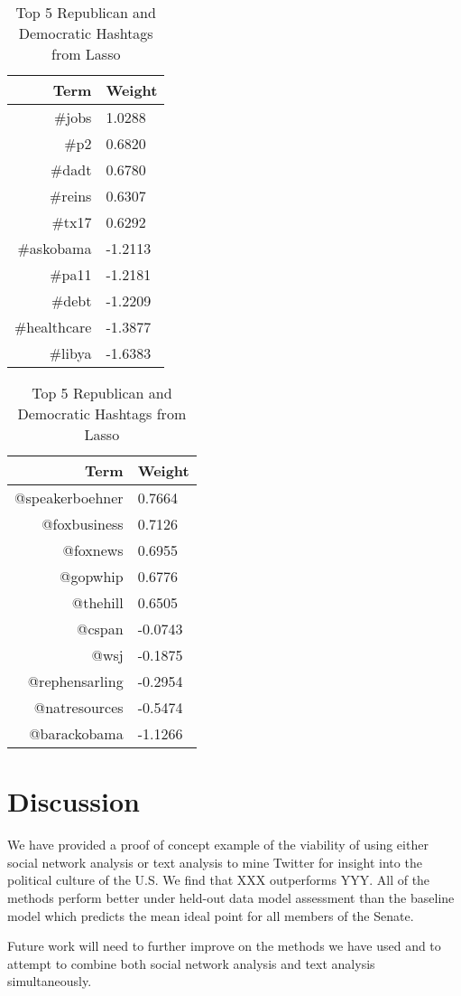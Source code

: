 \documentclass[11pt]{article}
\begin{document}
\begin{table}[htdp]
\caption{Top 5 Republican and Democratic Hashtags from Lasso}
\begin{center}
\begin{tabular}{|r|l|}
\hline
Term & Weight \\
\hline
\#jobs & 1.0288 \\
\#p2 & 0.6820 \\
\#dadt & 0.6780 \\
\#reins & 0.6307 \\
\#tx17 & 0.6292 \\
\hline
\#askobama & -1.2113 \\
\#pa11 & -1.2181 \\
\#debt & -1.2209 \\
\#healthcare & -1.3877 \\
\#libya & -1.6383 \\
\hline
\end{tabular}
\end{center}
\end{table}

\begin{table}[htdp]
\caption{Top 5 Republican and Democratic Hashtags from Lasso}
\begin{center}
\begin{tabular}{|r|l|}
\hline
Term & Weight \\
\hline
@speakerboehner & 0.7664 \\
@foxbusiness & 0.7126 \\
@foxnews & 0.6955 \\
@gopwhip & 0.6776 \\
@thehill & 0.6505 \\
\hline
@cspan & -0.0743 \\
@wsj & -0.1875 \\
@rephensarling & -0.2954 \\
@natresources & -0.5474 \\
@barackobama & -1.1266 \\
\hline
\end{tabular}
\end{center}
\end{table}

\section{Discussion}
We have provided a proof of concept example of the viability of using either social network analysis or text analysis to mine Twitter for insight into the political culture of the U.S. We find that XXX outperforms YYY. All of the methods perform better under held-out data model assessment than the baseline model which predicts the mean ideal point for all members of the Senate.

Future work will need to further improve on the methods we have used and to attempt to combine both social network analysis and text analysis simultaneously.
\end{document}
